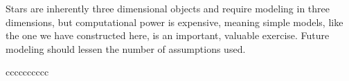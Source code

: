 \documentclass[twocolumn]{aastex631}
\begin{document}
Stars are inherently three dimensional objects and require modeling in three dimensions, but computational power is expensive, meaning simple models, like the one we have constructed here, is an important, valuable exercise. Future modeling should lessen the number of assumptions used.


\begin{deluxetable*}{cccccccccc}
\tablewidth{0pt}


\end{deluxetable*}
\end{document}
